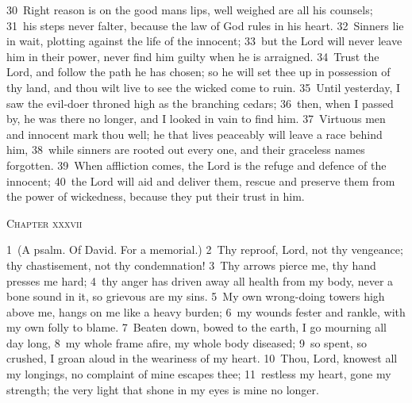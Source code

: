 \documentclass[10pt]{book} %
\begin{document}
\textcolor{benred8}{30}~Right reason is on the good man\textquotesingle s lips, well weighed are all his counsels; \textcolor{benred8}{31}~his steps never falter, because the law of God rules in his heart. \textcolor{benred8}{32}~Sinners lie in wait, plotting against the life of the innocent; \textcolor{benred8}{33}~but the Lord will never leave him in their power, never find him guilty when he is arraigned. \textcolor{benred8}{34}~Trust the Lord, and follow the path he has chosen; so he will set thee up in possession of thy land, and thou wilt live to see the wicked come to ruin. \textcolor{benred8}{35}~Until yesterday, I saw the evil-doer throned high as the branching cedars; \textcolor{benred8}{36}~then, when I passed by, he was there no longer, and I looked in vain to find him. \textcolor{benred8}{37}~Virtuous men and innocent mark thou well; he that lives peaceably will leave a race behind him, \textcolor{benred8}{38}~while sinners are rooted out every one, and their graceless names forgotten. \textcolor{benred8}{39}~When affliction comes, the Lord is the refuge and defence of the innocent; \textcolor{benred8}{40}~the Lord will aid and deliver them, rescue and preserve them from the power of wickedness, because they put their trust in him.
\begin{large}\begin{center}\textsc{Chapter xxxvii}\end{center}\end{large}
\textcolor{benred8}{1}~(A psalm. Of David. For a memorial.)
\textcolor{benred8}{2}~Thy reproof, Lord, not thy vengeance; thy chastisement, not thy condemnation! \textcolor{benred8}{3}~Thy arrows pierce me, thy hand presses me hard; \textcolor{benred8}{4}~thy anger has driven away all health from my body, never a bone sound in it, so grievous are my sins. \textcolor{benred8}{5}~My own wrong-doing towers high above me, hangs on me like a heavy burden; \textcolor{benred8}{6}~my wounds fester and rankle, with my own folly to blame. \textcolor{benred8}{7}~Beaten down, bowed to the earth, I go mourning all day long, \textcolor{benred8}{8}~my whole frame afire, my whole body diseased; \textcolor{benred8}{9}~so spent, so crushed, I groan aloud in the weariness of my heart. \textcolor{benred8}{10}~Thou, Lord, knowest all my longings, no complaint of mine escapes thee; \textcolor{benred8}{11}~restless my heart, gone my strength; the very light that shone in my eyes is mine no longer.
\end{document}

